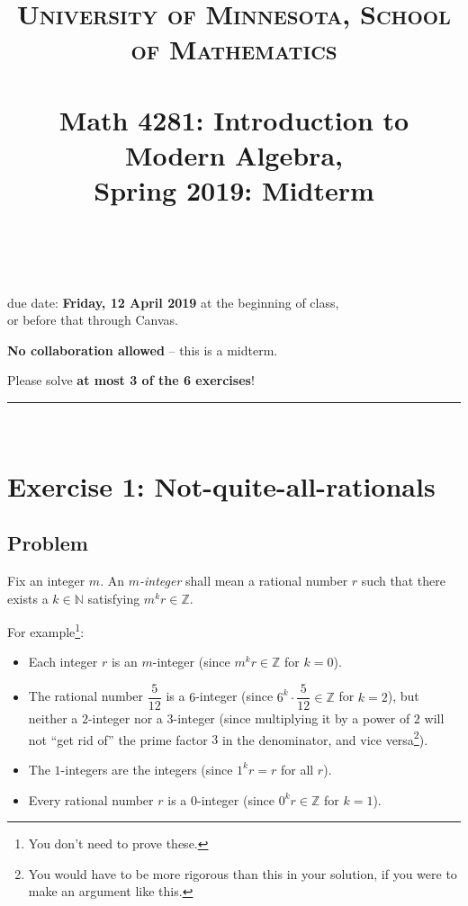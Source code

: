 \documentclass[paper=a4, fontsize=12pt]{scrartcl} %
\title{	
\normalfont \normalsize 
\textsc{University of Minnesota, School of Mathematics} \\ [25pt] %
\horrule{0.5pt} \\[0.4cm] %
\huge Math 4281: Introduction to Modern Algebra, \\
Spring 2019:
Midterm \psetnumber\\%
\horrule{2pt} \\[0.5cm] %
}
\author{\myname}
\newcommand{\NN}{\mathbb{N}} %
\newcommand{\ZZ}{\mathbb{Z}} %
\newcommand{\horrule}[1]{\rule{\linewidth}{#1}} %
\theoremstyle{plainsl}
\theoremstyle{definition}
\theoremstyle{remark}
\begin{document}
\maketitle %

\begin{center} %
{\large due date: \textbf{Friday, 12 April 2019} at the beginning of class, \\
or before that through Canvas.

\textbf{No collaboration allowed} -- this is a midterm.

Please solve \textbf{at most 3 of the 6 exercises}!}
\end{center}

\horrule{0.3pt} \\[0.4cm]

\section{Exercise 1: Not-quite-all-rationals}

\subsection{Problem}

Fix an integer $m$.
An \textit{$m$-integer} shall mean a rational number
$r$ such that there exists a $k \in \NN$ satisfying
$m^k r \in \ZZ$.

For example\footnote{You don't need to prove these.}:
\begin{itemize}
 \item Each integer $r$ is an $m$-integer (since $m^k r \in \ZZ$
       for $k = 0$).
 \item The rational number $\dfrac{5}{12}$
       is a $6$-integer (since $6^k \cdot \dfrac{5}{12} \in \ZZ$
       for $k = 2$), but neither a $2$-integer nor a $3$-integer
       (since multiplying it by a power of $2$ will not ``get
       rid of'' the prime factor $3$ in the denominator, and
       vice versa\footnote{You would have to be more rigorous
       than this in your solution, if you were to make an
       argument like this.}).
 \item The $1$-integers are the integers (since $1^k r = r$
       for all $r$).
 \item Every rational number $r$ is a $0$-integer (since
       $0^k r \in \ZZ$ for $k = 1$).
\end{itemize}
\end{document}
